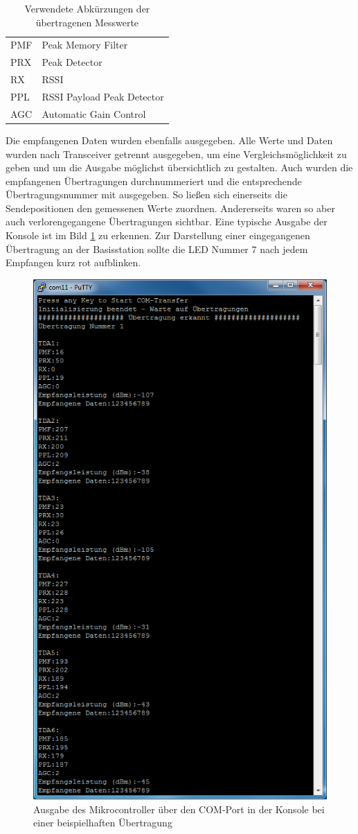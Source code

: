 \begin{table}[tbh]
	\centering
	\begin{tabular}{ll}
		
		PMF			&Peak Memory Filter\\
		PRX			&Peak Detector\\
		RX			&\acf{RSSI}\\
		PPL			&RSSI Payload Peak Detector\\
		AGC			&Automatic Gain Control\\
		
	\end{tabular}
	\caption{Verwendete Abkürzungen der übertragenen Messwerte}
	\label{tab:RSSI}
\end{table}
Die empfangenen Daten wurden ebenfalls ausgegeben. 
Alle Werte und Daten wurden nach Transceiver getrennt ausgegeben, um eine Vergleichsmöglichkeit zu geben und um die Ausgabe möglichst übersichtlich zu gestalten.
Auch wurden die empfangenen Übertragungen durchnummeriert und die entsprechende Übertragungsnummer mit ausgegeben. So ließen sich einerseits die Sendepositionen den gemessenen Werte zuordnen. Andererseits waren so aber auch  verlorengegangene  Übertragungen sichtbar. Eine typische Ausgabe der Konsole ist im Bild \ref{fig:ConsolePutty} zu erkennen. Zur Darstellung einer eingegangenen Übertragung an der Basisstation sollte die LED Nummer 7 nach jedem Empfangen kurz rot aufblinken.
\begin{figure}[h]
\centering
\includegraphics[width=0.7\linewidth]{Abbildungen/Aufnahmen/Bilder/Putty/Ubertragung1}
\caption{Ausgabe des Mikrocontroller über den COM-Port in der Konsole bei einer beispielhaften Übertragung}
\label{fig:ConsolePutty}
\end{figure}





